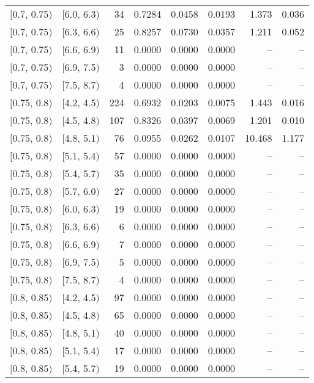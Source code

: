 \begin{longtable}{| l | l | r | r | r | r | r | r |}
        $[$0.7, 0.75$)$ & $[$6.0, 6.3$)$ & 34 & 0.7284 & 0.0458 & 0.0193 & 1.373 & 0.036 \\
        $[$0.7, 0.75$)$ & $[$6.3, 6.6$)$ & 25 & 0.8257 & 0.0730 & 0.0357 & 1.211 & 0.052 \\
        $[$0.7, 0.75$)$ & $[$6.6, 6.9$)$ & 11 & 0.0000 & 0.0000 & 0.0000 & -- & -- \\
        $[$0.7, 0.75$)$ & $[$6.9, 7.5$)$ & 3 & 0.0000 & 0.0000 & 0.0000 & -- & -- \\
        $[$0.7, 0.75$)$ & $[$7.5, 8.7$)$ & 4 & 0.0000 & 0.0000 & 0.0000 & -- & -- \\
        $[$0.75, 0.8$)$ & $[$4.2, 4.5$)$ & 224 & 0.6932 & 0.0203 & 0.0075 & 1.443 & 0.016 \\
        $[$0.75, 0.8$)$ & $[$4.5, 4.8$)$ & 107 & 0.8326 & 0.0397 & 0.0069 & 1.201 & 0.010 \\
        $[$0.75, 0.8$)$ & $[$4.8, 5.1$)$ & 76 & 0.0955 & 0.0262 & 0.0107 & 10.468 & 1.177 \\
        $[$0.75, 0.8$)$ & $[$5.1, 5.4$)$ & 57 & 0.0000 & 0.0000 & 0.0000 & -- & -- \\
        $[$0.75, 0.8$)$ & $[$5.4, 5.7$)$ & 35 & 0.0000 & 0.0000 & 0.0000 & -- & -- \\
        $[$0.75, 0.8$)$ & $[$5.7, 6.0$)$ & 27 & 0.0000 & 0.0000 & 0.0000 & -- & -- \\
        $[$0.75, 0.8$)$ & $[$6.0, 6.3$)$ & 19 & 0.0000 & 0.0000 & 0.0000 & -- & -- \\
        $[$0.75, 0.8$)$ & $[$6.3, 6.6$)$ & 6 & 0.0000 & 0.0000 & 0.0000 & -- & -- \\
        $[$0.75, 0.8$)$ & $[$6.6, 6.9$)$ & 7 & 0.0000 & 0.0000 & 0.0000 & -- & -- \\
        $[$0.75, 0.8$)$ & $[$6.9, 7.5$)$ & 5 & 0.0000 & 0.0000 & 0.0000 & -- & -- \\
        $[$0.75, 0.8$)$ & $[$7.5, 8.7$)$ & 4 & 0.0000 & 0.0000 & 0.0000 & -- & -- \\
        $[$0.8, 0.85$)$ & $[$4.2, 4.5$)$ & 97 & 0.0000 & 0.0000 & 0.0000 & -- & -- \\
        $[$0.8, 0.85$)$ & $[$4.5, 4.8$)$ & 65 & 0.0000 & 0.0000 & 0.0000 & -- & -- \\
        $[$0.8, 0.85$)$ & $[$4.8, 5.1$)$ & 40 & 0.0000 & 0.0000 & 0.0000 & -- & -- \\
        $[$0.8, 0.85$)$ & $[$5.1, 5.4$)$ & 17 & 0.0000 & 0.0000 & 0.0000 & -- & -- \\
        $[$0.8, 0.85$)$ & $[$5.4, 5.7$)$ & 19 & 0.0000 & 0.0000 & 0.0000 & -- & -- \\

\end{longtable}
